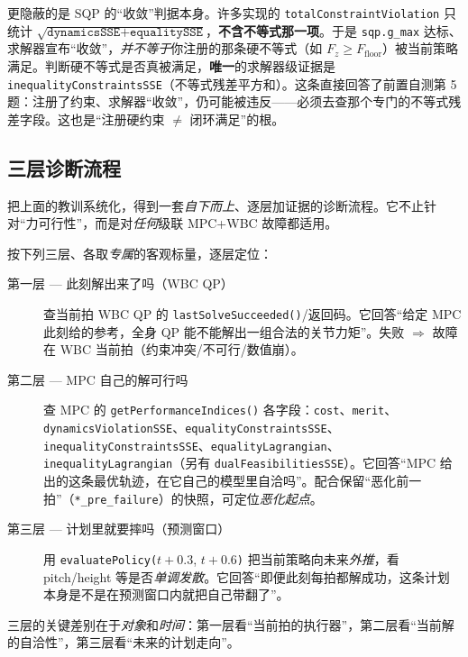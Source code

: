 \begin{insight}\label{ins:ld-gmax}
更隐蔽的是 SQP 的“收敛”判据本身。许多实现的 \texttt{totalConstraintViolation} 只统计 $\sqrt{\texttt{dynamicsSSE}+\texttt{equalitySSE}}$，\textbf{不含不等式那一项}。于是 \texttt{sqp.g\_max} 达标、求解器宣布“收敛”，\emph{并不等于}你注册的那条硬不等式（如 $F_z\ge F_{\mathrm{floor}}$）被当前策略满足。判断硬不等式是否真被满足，\textbf{唯一}的求解器级证据是 \texttt{inequalityConstraintsSSE}（不等式残差平方和）。这条直接回答了前置自测第 5 题：注册了约束、求解器“收敛”，仍可能被违反——必须去查那个专门的不等式残差字段。这也是“注册硬约束 $\ne$ 闭环满足”的根。
\end{insight}

\subsection{三层诊断流程}
\label{subsec:ld-flow}

把上面的教训系统化，得到一套\emph{自下而上}、逐层加证据的诊断流程。它不止针对“力可行性”，而是对\emph{任何}级联 MPC+WBC 故障都适用。

\begin{insight}\label{ins:ld-three-layer}
按下列三层、各取\emph{专属}的客观标量，逐层定位：
\begin{description}
  \item[第一层 — 此刻解出来了吗（WBC QP）] 查当前拍 WBC QP 的 \texttt{lastSolveSucceeded()}/返回码。它回答“给定 MPC 此刻给的参考，全身 QP 能不能解出一组合法的关节力矩”。失败 $\Rightarrow$ 故障在 WBC 当前拍（约束冲突/不可行/数值崩）。
  \item[第二层 — MPC 自己的解可行吗] 查 MPC 的 \texttt{getPerformanceIndices()} 各字段：\texttt{cost}、\texttt{merit}、\texttt{dynamicsViolationSSE}、\texttt{equalityConstraintsSSE}、\texttt{inequalityConstraintsSSE}、\texttt{equalityLagrangian}、\texttt{inequalityLagrangian}（另有 \texttt{dualFeasibilitiesSSE}）。它回答“MPC 给出的这条最优轨迹，在它自己的模型里自洽吗”。配合保留“恶化前一拍”（\texttt{*\_pre\_failure}）的快照，可定位\emph{恶化起点}。
  \item[第三层 — 计划里就要摔吗（预测窗口）] 用 \texttt{evaluatePolicy(}$t+0.3$, $t+0.6$\texttt{)} 把当前策略向未来\emph{外推}，看 pitch/height 等是否\emph{单调发散}。它回答“即便此刻每拍都解成功，这条计划本身是不是在预测窗口内就把自己带翻了”。
\end{description}
三层的关键差别在于\emph{对象}和\emph{时间}：第一层看“当前拍的执行器”，第二层看“当前解的自洽性”，第三层看“未来的计划走向”。
\end{insight}

